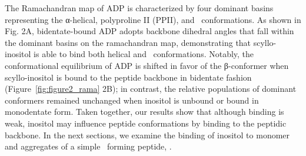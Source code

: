 The Ramachandran map of ADP is characterized by four dominant basins representing the α-helical, polyproline II (PPII), and \bsheet\ conformations.\cite{Neale:2008p87} As shown in Fig. 2A, bidentate-bound ADP adopts backbone dihedral angles that fall within the dominant basins on the ramachandran map, demonstrating that scyllo-inositol is able to bind both helical and \bsheet\ conformations. Notably, the conformational equilibrium of ADP is shifted in favor of the β-conformer when scyllo-inositol is bound to the peptide backbone in bidentate fashion (Figure~\ref{fig:figure2_rama} 2B); in contrast, the relative populations of dominant conformers remained unchanged when inositol is unbound or bound in monodentate form. Taken together, our results show that although binding is weak, inositol may influence peptide conformations by binding to the peptidic backbone. In the next sections, we examine the binding of inositol to monomer and aggregates of a simple \bsheet\ forming peptide, \gafour.


